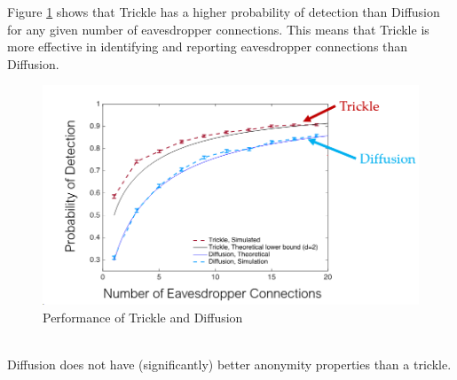 Figure \ref{fig:f11} shows that Trickle has a higher probability of detection than Diffusion for any given number of eavesdropper connections. This means that Trickle is more effective in identifying and reporting eavesdropper connections than Diffusion.
\begin{figure}[h!]
    \centering
    \includegraphics[width=0.7\linewidth]{Fig/04/F11}
    \caption{Performance of Trickle and Diffusion}
    \label{fig:f11}
\end{figure}\\
Diffusion does not have (significantly) better anonymity properties than a trickle.
 
